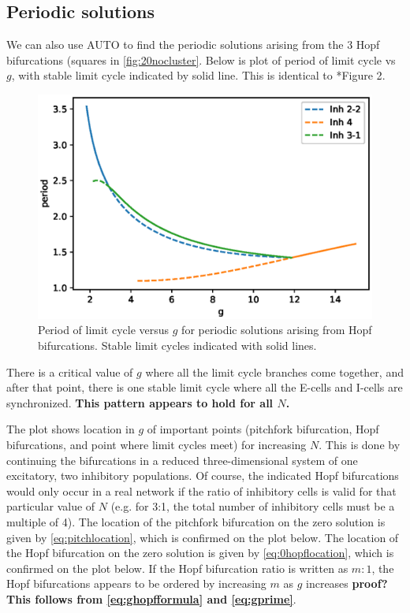 \documentclass[11pt,reqno]{amsart}
\begin{document}
\subsection{Periodic solutions}
We can also use AUTO to find the periodic solutions arising from the 3 Hopf bifurcations (squares in \cref{fig:20nocluster}. Below is plot of period of limit cycle vs $g$, with stable limit cycle indicated by solid line. This is identical to \cite{Barreiro2017}*{Figure 2}.

\begin{figure}[H]
    \centering
    \includegraphics[width=14cm]{images/periodvsg}
    \caption{Period of limit cycle versus $g$ for periodic solutions arising from Hopf bifurcations. Stable limit cycles indicated with solid lines.}
    \label{fig:periodvsg}
\end{figure}

There is a critical value of $g$ where all the limit cycle branches come together, and after that point, there is one stable limit cycle where all the E-cells and I-cells are synchronized.
\textbf{This pattern appears to hold for all $N$.}

The plot shows location in $g$ of important points (pitchfork bifurcation, Hopf bifurcations, and point where limit cycles meet) for increasing $N$. This is done by continuing the bifurcations in a reduced three-dimensional system of one excitatory, two inhibitory populations.  
Of course, the indicated Hopf bifurcations would only occur in a real network if the ratio of inhibitory cells is valid for that particular value of $N$ (e.g. for 3:1, the total number of inhibitory cells must be a multiple of 4). The location of the pitchfork bifurcation on the zero solution is given by \cref{eq:pitchlocation}, which is confirmed on the plot below. The location of the Hopf bifurcation on the zero solution is given by \cref{eq:0hopflocation}, which is confirmed on the plot below. If the Hopf bifurcation ratio is written as $m:1$, the Hopf bifurcations appears to be ordered by increasing $m$ as $g$ increases \textbf{proof? This follows from \cref{eq:ghopfformula} and \cref{eq:gprime}}.
\end{document}
